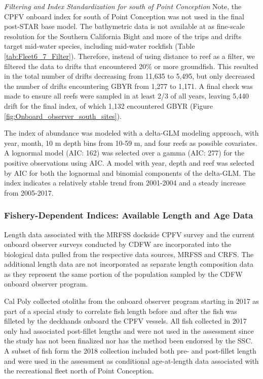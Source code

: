 \documentclass[12pt,]{article}
\begin{document}
\emph{Filtering and Index Standardization for south of Point Conception}
Note, the CPFV onboard index for south of Point Conception was not used
in the final post-STAR base model. The bathymetric data is not available
at as fine-scale resolution for the Southern California Bight and more
of the trips and drifts target mid-water species, including mid-water
rockfish (Table \ref{tab:Fleet6_7_Filter}). Therefore, instead of using
distance to reef as a filter, we filtered the data to drifts that
encountered 20\% or more groundfish. This resulted in the total number
of drifts decreasing from 11,635 to 5,495, but only decreased the number
of drifts encountering GBYR from 1,277 to 1,171. A final check was made
to ensure all reefs were sampled in at least 2/3 of all years, leaving
5,440 drift for the final index, of which 1,132 encountered GBYR (Figure
\ref{fig:Onboard_observer_south_sites}).

The index of abundance was modeled with a delta-GLM modeling approach,
with year, month, 10 m depth bins from 10-59 m, and four reefs as
possible covariates. A lognormal model (AIC: 162) was selected over a
gamma (AIC: 277) for the positive observations using AIC. A model with
year, depth and reef was selected by AIC for both the lognormal and
binomial components of the delta-GLM. The index indicates a relatively
stable trend from 2001-2004 and a steady increase from 2005-2017.

\subsubsection{Fishery-Dependent Indices: Available Length and Age
Data}\label{fishery-dependent-indices-available-length-and-age-data}

Length data associated with the MRFSS dockside CPFV survey and the
current onboard observer surveys conducted by CDFW are incorporated into
the biological data pulled from the respective data sources, MRFSS and
CRFS. The additional length data are not incorporated as separate length
composition data as they represent the same portion of the population
sampled by the CDFW onboard observer program.

Cal Poly collected otoliths from the onboard observer program starting
in 2017 as part of a special study to correlate fish length before and
after the fish was filleted by the deckhands onboard the CPFV vessels.
All fish collected in 2017 only had associated post-fillet lengths and
were not used in the assessment since the study has not been finalized
nor has the method been endorsed by the SSC. A subset of fish form the
2018 collection included both pre- and post-fillet length and were used
in the assessment as conditional age-at-length data associated with the
recreational fleet north of Point Conception.
\end{document}
